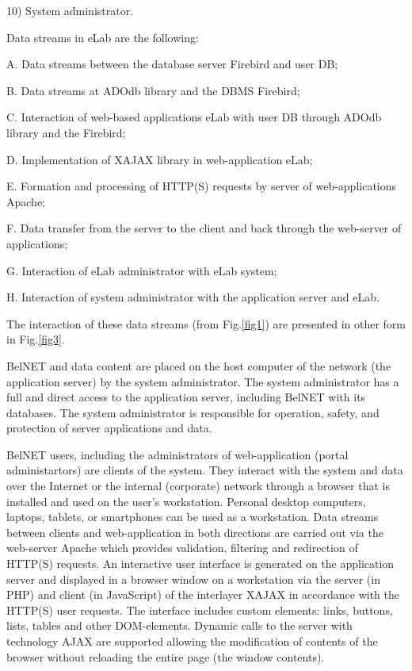 \documentclass[12pt]{article}
\begin{document}
10) System administrator.

Data streams in eLab are the following:

A. Data streams between the database server Firebird and user DB;

B. Data streams at ADOdb library and the DBMS Firebird;

C. Interaction of web-based applications eLab with user DB through ADOdb library and the Firebird;

D. Implementation of XAJAX library in web-application eLab;

E. Formation and processing of HTTP(S) requests by server of web-applications Apache;

F. Data transfer from the server to the client and back through the web-server of applications;

G. Interaction of eLab administrator with eLab system;

H. Interaction of system administrator with the application server
and eLab.

The interaction of these data streams (from Fig.\ref{fig1}) are
presented in other form in Fig.\ref{fig3}.

BelNET and data content are placed on the host computer of the
network (the application server) by the system administrator. The
system administrator has a full and direct access to the
application  server, including  BelNET with its databases. The
system administrator is responsible for operation, safety, and
protection of server applications and data.

BelNET users, including the administrators of web-application
(portal administartors) are clients of the system. They interact
with the system and data over the Internet or the internal
(corporate) network through a browser that is installed and used
on the user's workstation. Personal desktop computers, laptops,
tablets, or smartphones can be used as a workstation. Data streams
between clients and web-application in both directions are carried
out via the web-server Apache which provides validation, filtering
and redirection of HTTP(S) requests. An interactive user interface
is generated on the application server and displayed in a browser
window on a workstation via the server (in PHP) and client (in
JavaScript) of the interlayer XAJAX in accordance with the HTTP(S)
user requests. The interface includes custom elements: links,
buttons, lists, tables and other DOM-elements. Dynamic calls to
the server with technology AJAX are supported allowing the
modification of contents of the browser without reloading the
entire page (the window contents).
\end{document}
